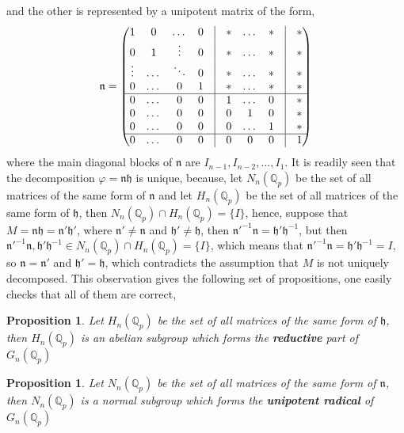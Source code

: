 \documentclass[12pt]{article}
\newtheorem{proposition}[theorem]{Proposition}
\begin{document}
and the other is represented by a unipotent matrix of the form, \[\mathfrak{n}=\begin{pmatrix}
1 &0 &\dots &0 &\vline &* &\dots &* &\vline& *\\
0& 1 &\vdots &0 &\vline&* &\dots &* &\vline&*\\
\vdots& \dots& \ddots & 0&\vline& *& \dots& *&\vline & *\\
0& \dots& 0& 1&\vline & * & \dots & * &\vline & *\\
\hline
0&\dots &0 & 0& \vline &1&\dots &0&\vline&*\\
0&\dots &0 & 0& \vline & 0 & 1 & 0 &\vline &*\\
0&\dots &0 & 0& \vline & 0 & \dots & 1 &\vline &*\\
\hline
0&\dots &0 & 0& \vline & 0 & 0 & 0 &\vline &1\\
\end{pmatrix}
\]
where the main diagonal blocks of $\mathfrak{n}$ are $I_{n-1},I_{n-2},\dots,I_1$. It is readily seen that the decomposition $\varphi=\mathfrak{nh}$ is unique, because, let $N_n(\mathbb{Q}_p)$ be the set of all matrices of the same form of $\mathfrak{n}$ and let $ H_n(\mathbb{Q}_p)$ be the set of all matrices of the same form of $\mathfrak{h}$, then $N_n(\mathbb{Q}_p)\cap H_n(\mathbb{Q}_p)=\{I\}$, hence, suppose that $M=\mathfrak{nh}=\mathfrak{n'h'}$, where $\mathfrak{n}'\neq \mathfrak{n}$ and $\mathfrak{h}'\neq \mathfrak{h}$, then $\mathfrak{n}'^{-1}\mathfrak{n}=\mathfrak{h}'\mathfrak{h}^{-1}$, but then $\mathfrak{n}'^{-1}\mathfrak{n},\mathfrak{h}'\mathfrak{h}^{-1}\in N_n(\mathbb{Q}_p)\cap H_n(\mathbb{Q}_p)=\{I\}$, which means that $\mathfrak{n}'^{-1}\mathfrak{n}=\mathfrak{h}'\mathfrak{h}^{-1}=I$, so $\mathfrak{n}=\mathfrak{n}'$ and $\mathfrak{h}'=\mathfrak{h}$, which contradicts the assumption that $M$ is not uniquely decomposed.
This observation gives the following set of propositions, one easily checks that all of them are correct,
\begin{proposition}
\label{prop.automorphism.subgroup.h}
Let $H_n(\mathbb{Q}_p)$ be the set of all matrices of the same form of $\mathfrak{h}$, then $ H_n(\mathbb{Q}_p)$ is an abelian subgroup which forms the \textbf{reductive} part of $G_n(\mathbb{Q}_p)$
\end{proposition}
\begin{proposition}
\label{prop.automorphism.subgroup.n}
Let $N_n(\mathbb{Q}_p)$ be the set of all matrices of the same form of $\mathfrak{n}$, then $N_n(\mathbb{Q}_p)$ is a normal subgroup which forms the \textbf{unipotent radical} of $G_n(\mathbb{Q}_p)$
\end{proposition}
\end{document}
